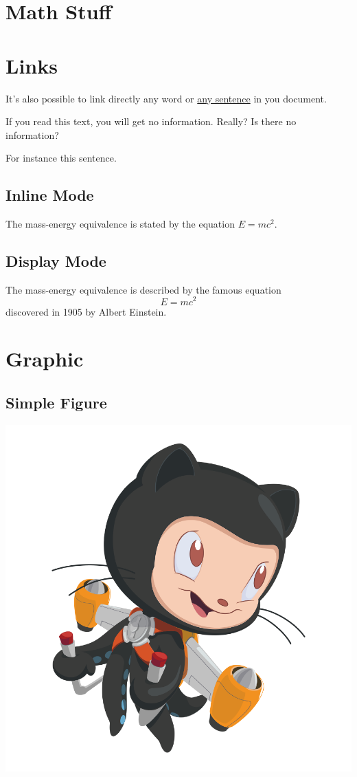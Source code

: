 \documentclass[12pt, letterpaper]{article}
\begin{document}
\section{Math Stuff}

\section{Links}
It's also possible to link directly any word 
or \hyperlink{thesentence}{any sentence} in you document.

If you read this text, you will get no information.  Really?  
Is there no information?

For instance \hypertarget{thesentence}{this sentence}.

\subsection{Inline Mode}
The mass-energy equivalence is stated by the equation $E=mc^2$.

\subsection{Display Mode}
The mass-energy equivalence is described by the famous equation
\[ E=mc^2 \]
discovered in 1905 by Albert Einstein. 

\section{Graphic}
\subsection{Simple Figure}
\includegraphics[scale = 0.2]{octocat.png} %
\end{document}
